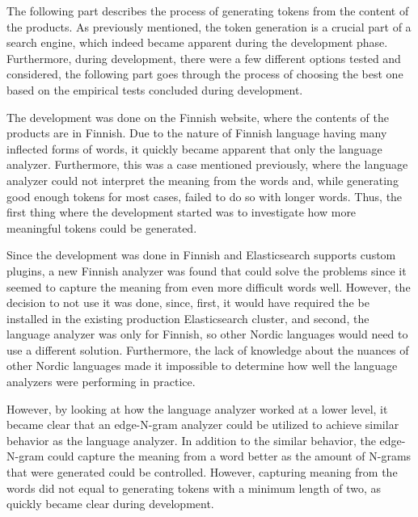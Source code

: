 The following part describes the process of generating tokens from the content of the products.
As previously mentioned, the token generation is a crucial part of a search engine, which indeed became
apparent during the development phase.
Furthermore, during development, there were a few different options tested and considered, the following
part goes through the process of choosing the best one based on the empirical tests concluded 
during development.


The development was done on the Finnish website, where the contents of the products are in Finnish.
Due to the nature of Finnish language having many inflected forms of words, 
it quickly became apparent that only the language analyzer.
Furthermore, this was a case mentioned previously, where the language analyzer could not interpret the meaning
from the words and, while generating good enough tokens for most cases, failed to do so with longer words.
Thus, the first thing where the development started was to investigate how more meaningful tokens could 
be generated.


Since the development was done in Finnish and Elasticsearch supports custom plugins, a new Finnish analyzer 
was found that could solve the problems since it seemed to capture the meaning from even more difficult words well.
However, the decision to not use it was done, since, first, 
it would have required the be installed in the existing production Elasticsearch cluster, and second, 
the language analyzer was only for Finnish, so other Nordic languages would need to use a different solution.
Furthermore, the lack of knowledge about the nuances of other Nordic languages made it impossible to determine
how well the language analyzers were performing in practice.


However, by looking at how the language analyzer worked at a lower level, it became clear that an edge-N-gram analyzer
could be utilized to achieve similar behavior as the language analyzer.
In addition to the similar behavior, the edge-N-gram could capture the meaning from a word better
as the amount of N-grams that were generated could be controlled.
However, capturing meaning from the words did not equal to generating tokens with a minimum length of two, as 
quickly became clear during development.


